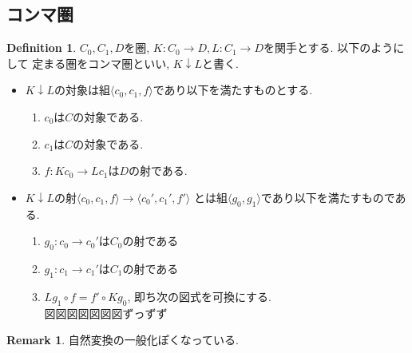 \documentclass[a4paper,10pt]{article}
\theoremstyle{definition}
\newtheorem{definition}[thm]{\bfseries Definition}
\newtheorem{remark}[thm]{\bfseries Remark}    %
\begin{document}
\subsection{コンマ圏}
\begin{definition}
    $C_0, C_1, D$を圏, $K: C_0 \rightarrow D, L: C_1 \rightarrow D$を関手とする. 以下のようにして
    定まる圏をコンマ圏といい, $K \downarrow L$と書く.
    \begin{itemize}
        \item $K \downarrow L$の対象は組$\langle c_0, c_1, f \rangle$であり以下を満たすものとする.
        \begin{enumerate}[(1)]
            \item $c_0$は$C$の対象である.
            \item $c_1$は$C$の対象である.
            \item $f: K c_0 \rightarrow L c_1$は$D$の射である.
        \end{enumerate}
        \item $K \downarrow L$の射$\langle c_0, c_1, f \rangle \rightarrow \langle c_0', c_1', f' \rangle$
        とは組$\langle g_0, g_1 \rangle$であり以下を満たすものである.
        \begin{enumerate}[(1)]
            \item $g_0: c_0 \rightarrow c_0'$は$C_0$の射である
            \item $g_1: c_1 \rightarrow c_1'$は$C_1$の射である
            \item $L g_1 \circ f = f' \circ K g_0$, 即ち次の図式を可換にする.\\
            図図図図図図図ずっずず
        \end{enumerate}
    \end{itemize}
\end{definition}
\begin{remark}
    自然変換の一般化ぽくなっている.
\end{remark}
\end{document}
